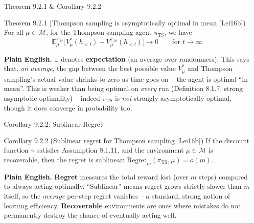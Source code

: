 \documentclass[aspectratio=169,10pt]{beamer}
\newcommand{\E}{\mathbb{E}}
\begin{document}
\begin{frame}{Theorem 9.2.1 \& Corollary 9.2.2}
  \begin{block}{Theorem 9.2.1 (Thompson sampling is asymptotically optimal in mean [Lei16b])}
    For all $\mu\in\mathcal{M}$, for the Thompson sampling agent
    $\pi_{\mathrm{TS}}$, we have
    \[
      \E^{\pi_{\mathrm{TS}}}_\mu\big[V^*_\mu(h_{<t}) - V^{\pi_{\mathrm{TS}}}_\mu(h_{<t})\big] \to 0 \qquad \text{for } t\to\infty
    \]
  \end{block}
  \textbf{Plain English.} $\E$ denotes \textbf{expectation} (an average over
  randomness). This says that, \emph{on average}, the gap between the best
  possible value $V^*_\mu$ and Thompson sampling's actual value shrinks to
  zero as time goes on -- the agent is optimal ``in mean''. This is weaker
  than being optimal on \emph{every} run (Definition 8.1.7, strong
  asymptotic optimality) -- indeed $\pi_{\mathrm{TS}}$ is \emph{not} strongly
  asymptotically optimal, though it does converge in probability too.
\end{frame}

\begin{frame}{Corollary 9.2.2: Sublinear Regret}
  \begin{block}{Corollary 9.2.2 (Sublinear regret for Thompson sampling [Lei16b])}
    If the discount function $\gamma$ satisfies Assumption 8.1.11, and the
    environment $\mu\in\mathcal{M}$ is recoverable, then the regret is
    sublinear: $\mathrm{Regret}_m(\pi_{\mathrm{TS}},\mu) = o(m)$.
  \end{block}
  \textbf{Plain English.} \textbf{Regret} measures the total reward lost
  (over $m$ steps) compared to always acting optimally. ``Sublinear'' means
  regret grows strictly slower than $m$ itself, so the \emph{average}
  per-step regret vanishes -- a standard, strong notion of learning
  efficiency. \textbf{Recoverable} environments are ones where mistakes do
  not permanently destroy the chance of eventually acting well.
\end{frame}
\end{document}
